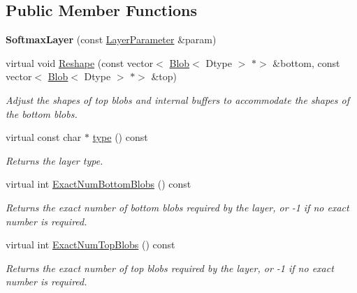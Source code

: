 \subsection*{Public Member Functions}
\begin{DoxyCompactItemize}
\item 
\mbox{\label{classcaffe_1_1_softmax_layer_a6a3b60c74c2c48e8d5f65595ec1b4268}} 
{\bfseries Softmax\+Layer} (const \mbox{\hyperlink{classcaffe_1_1_layer_parameter}{Layer\+Parameter}} \&param)
\item 
virtual void \mbox{\hyperlink{classcaffe_1_1_softmax_layer_a756fd5ad3af07d019b5f2247f38b4496}{Reshape}} (const vector$<$ \mbox{\hyperlink{classcaffe_1_1_blob}{Blob}}$<$ Dtype $>$ $\ast$$>$ \&bottom, const vector$<$ \mbox{\hyperlink{classcaffe_1_1_blob}{Blob}}$<$ Dtype $>$ $\ast$$>$ \&top)
\begin{DoxyCompactList}\small\item\em Adjust the shapes of top blobs and internal buffers to accommodate the shapes of the bottom blobs. \end{DoxyCompactList}\item 
\mbox{\label{classcaffe_1_1_softmax_layer_ab2481d025d184bff73c6ae5a5fa29ac1}} 
virtual const char $\ast$ \mbox{\hyperlink{classcaffe_1_1_softmax_layer_ab2481d025d184bff73c6ae5a5fa29ac1}{type}} () const
\begin{DoxyCompactList}\small\item\em Returns the layer type. \end{DoxyCompactList}\item 
virtual int \mbox{\hyperlink{classcaffe_1_1_softmax_layer_afe44488dde78e6bcf6d4bdad97ee4986}{Exact\+Num\+Bottom\+Blobs}} () const
\begin{DoxyCompactList}\small\item\em Returns the exact number of bottom blobs required by the layer, or -\/1 if no exact number is required. \end{DoxyCompactList}\item 
virtual int \mbox{\hyperlink{classcaffe_1_1_softmax_layer_a6bc4748c20e0940e5367ed4d50f4a11b}{Exact\+Num\+Top\+Blobs}} () const
\begin{DoxyCompactList}\small\item\em Returns the exact number of top blobs required by the layer, or -\/1 if no exact number is required. \end{DoxyCompactList}\item 

\end{DoxyCompactItemize}
